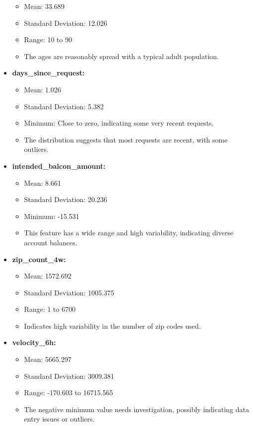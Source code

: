 \documentclass[12pt,a4paper]{report}
\begin{document}
\begin{itemize}
\begin{itemize}
            \item Mean: 33.689
            \item Standard Deviation: 12.026
            \item Range: 10 to 90
            \item The ages are reasonably spread with a typical adult population.
        \end{itemize}
    \item \textbf{days\_since\_request:}
        \begin{itemize}
            \item Mean: 1.026
            \item Standard Deviation: 5.382
            \item Minimum: Close to zero, indicating some very recent requests.
            \item The distribution suggests that most requests are recent, with some outliers.
        \end{itemize}
    \item \textbf{intended\_balcon\_amount:}
        \begin{itemize}
            \item Mean: 8.661
            \item Standard Deviation: 20.236
            \item Minimum: -15.531
            \item This feature has a wide range and high variability, indicating diverse account balances.
        \end{itemize}
    \item \textbf{zip\_count\_4w:}
        \begin{itemize}
            \item Mean: 1572.692
            \item Standard Deviation: 1005.375
            \item Range: 1 to 6700
            \item Indicates high variability in the number of zip codes used.
        \end{itemize}
    \item \textbf{velocity\_6h:}
        \begin{itemize}
            \item Mean: 5665.297
            \item Standard Deviation: 3009.381
            \item Range: -170.603 to 16715.565
            \item The negative minimum value needs investigation, possibly indicating data entry issues or outliers.
        \end{itemize}
\end{itemize}
\end{document}

